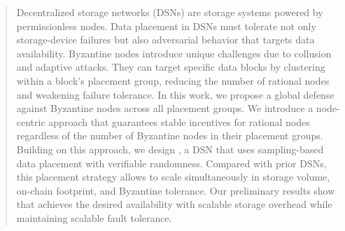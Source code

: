\begin{abstract}
Decentralized storage networks (DSNs) are storage systems powered by permissionless nodes.
Data placement in DSNs must tolerate not only storage-device failures but also adversarial behavior that targets data availability.
Byzantine nodes introduce unique challenges due to collusion and adaptive attacks.
They can target specific data blocks by clustering within a block's placement group, reducing the number of rational nodes and weakening failure tolerance.
In this work, we propose a global defense against Byzantine nodes across all placement groups.
We introduce a node-centric approach that guarantees stable incentives for rational nodes regardless of the number of Byzantine nodes in their placement groups.
Building on this approach, we design \sys, a DSN that uses sampling-based data placement with verifiable randomness.
Compared with prior DSNs, this placement strategy allows \sys to scale simultaneously in storage volume, on-chain footprint, and Byzantine tolerance.
Our preliminary results show that \sys achieves the desired availability with scalable storage overhead while maintaining scalable fault tolerance.
\end{abstract}